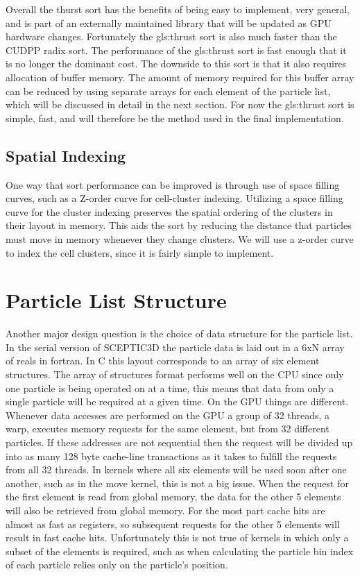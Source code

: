 Overall the thurst sort has the benefits of being easy to implement, very general, and is part of an externally maintained library that will be updated as GPU hardware changes. Fortunately the \gls{gls:thrust} sort is also much faster than the CUDPP radix sort. The performance of the \gls{gls:thrust} sort is fast enough that it is no longer the dominant cost. The downside to this sort is that it also requires allocation of buffer memory. The amount of memory required for this buffer array can be reduced by using separate arrays for each element of the particle list, which will be discussed in detail in the next section. For now the \gls{gls:thrust} sort is simple, fast, and will therefore be the method used in the final implementation. 

\subsection{Spatial Indexing}

One way that sort performance can be improved is through use of space filling curves, such as a Z-order curve for cell-cluster indexing. Utilizing a space filling curve for the cluster indexing preserves the spatial ordering of the clusters in their layout in memory. This aids the sort by reducing the distance that particles must move in memory whenever they change clusters. We will use a z-order curve to index the cell clusters, since it is fairly simple to implement.

	\section{Particle List Structure}

Another major design question is the choice of data structure for the particle list. In the serial version of SCEPTIC3D the particle data is laid out in a 6xN array of reals in fortran. In C this layout corresponds to an array of six element structures. The array of structures format performs well on the CPU since only one particle is being operated on at a time, this means that data from only a single particle will be required at a given time. On the GPU things are different. Whenever data accesses are performed on the GPU a group of 32 threads, a warp, executes memory requests for the same element, but from 32 different particles. If these addresses are not sequential then the request will be divided up into as many 128 byte cache-line transactions as it takes to fulfill the requests from all 32 threads. In kernels where all six elements will be used soon after one another, such as in the move kernel, this is not a big issue. When the request for the first element is read from global memory, the data for the other 5 elements will also be retrieved from global memory. For the most part cache hits are almost as fast as registers, so subsequent requests for the other 5 elements will result in fast cache hits. Unfortunately this is not true of kernels in which only a subset of the elements is required, such as when calculating the particle bin index of each particle relies only on the particle's position. \cite{NVIDIACorporation2011}

